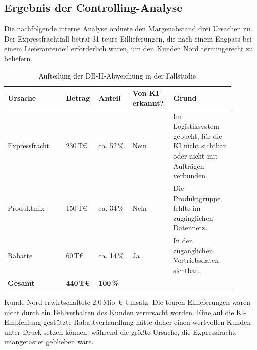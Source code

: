 \documentclass[a4paper,12pt]{article}
\theoremstyle{definition}
\begin{document}
\subsection{Ergebnis der Controlling-Analyse}
Die nachfolgende interne Analyse ordnete den Margenabstand drei Ursachen zu. Der Expressfrachtfall betraf 31 teure Eillieferungen, die nach einem Engpass bei einem Lieferantenteil erforderlich waren, um den Kunden Nord termingerecht zu beliefern.

\begin{table}[htbp]
\centering
\small
\caption{Aufteilung der DB-II-Abweichung in der Fallstudie}
\label{tab:margin-case}
\begin{tabular}{p{0.24\linewidth}p{0.10\linewidth}p{0.14\linewidth}p{0.16\linewidth}p{0.25\linewidth}}
\toprule
\textbf{Ursache} & \textbf{Betrag} & \textbf{Anteil} & \textbf{Von KI erkannt?} & \textbf{Grund} \\
\midrule
Expressfracht & 230\,T€ & ca. 52\,\% & Nein & Im Logistiksystem gebucht, für die KI nicht sichtbar oder nicht mit Aufträgen verbunden. \\
Produktmix & 150\,T€ & ca. 34\,\% & Nein & Die Produktgruppe fehlte im zugänglichen Datennetz. \\
Rabatte & 60\,T€ & ca. 14\,\% & Ja & In den zugänglichen Vertriebsdaten sichtbar. \\
\midrule
\textbf{Gesamt} & \textbf{440\,T€} & \textbf{100\,\%} & & \\
\bottomrule
\end{tabular}
\end{table}

Kunde Nord erwirtschaftete 2{,}0\,Mio.\,€ Umsatz. Die teuren Eillieferungen waren nicht durch ein Fehlverhalten des Kunden verursacht worden. Eine auf die KI-Empfehlung gestützte Rabattverhandlung hätte daher einen wertvollen Kunden unter Druck setzen können, während die größte Ursache, die Expressfracht, unangetastet geblieben wäre.
\end{document}

